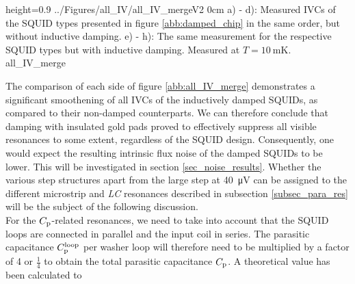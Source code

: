 {height=0.9\textheight}
{../Figures/all_IV/all_IV_mergeV2}
{0cm}
{a) - d): Measured IVCs of the SQUID types presented in figure \ref{abb:damped_chip} in the same order, but without inductive damping. e) - h): The same measurement for the respective SQUID types but with inductive damping. Measured at $T=\qty{10}{\milli\kelvin}$.} 
{all_IV_merge}

The comparison of each side of figure \ref{abb:all_IV_merge} demonstrates a significant smoothening of all IVCs of the inductively damped SQUIDs, as compared to their non-damped counterparts. We can therefore conclude that damping with insulated gold pads proved to effectively suppress all visible resonances to some extent, regardless of the SQUID design. Consequently, one would expect the resulting intrinsic flux noise of the damped SQUIDs to be lower. This will be investigated in section \ref{sec_noise_results}. Whether the various step structures apart from the large step at \qty{40}{\uV} can be assigned to the different microstrip and \textit{LC} resonances described in subsection \ref{subsec_para_res} will be the subject of the following discussion. \\

For the $C_{\rm p}$-related resonances, we need to take into account that the SQUID loops are connected in parallel and the input coil in series. The parasitic capacitance $C_{\rm p}^{\rm loop}$ per washer loop will therefore need to be multiplied by a factor of 4 or $\frac{1}{4}$ to obtain the total parasitic capacitance $C_{\rm p}$. A theoretical value has been calculated to \cite{EnpukuI1991, EnpukuIII1992}    
  

